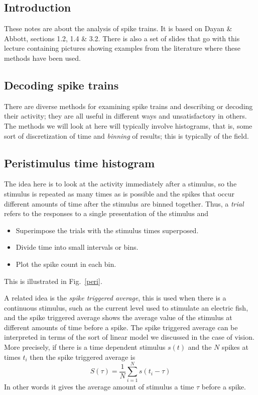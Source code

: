 \documentclass[11pt,a4paper]{scrartcl}
\begin{document}
\subsection*{Introduction}
These notes are about the analysis of spike trains. It is based on
Dayan \& Abbott, sections 1.2, 1.4 \& 3.2. There is also a set of
slides that go with this lecture containing pictures showing examples
from the literature where these methods have been used.

\subsection*{Decoding spike trains}
There are diverse methods for examining spike trains and describing or
decoding their activity; they are all useful in different ways and
unsatisfactory in others. The methods we will look at here will
typically involve histograms, that is, some sort of discretization of
time and \textsl{binning} of results; this is typically of the field.

\subsection*{Peristimulus time histogram}
The idea here is to look at the activity immediately after a
stimulus, so the stimulus is repeated as many times as is possible and
the spikes that occur different amounts of time after the stimulus are
binned together. Thus, a \textsl{trial} refers to the responses to a single presentation of the stimulus and
\begin{itemize}
\item Superimpose the trials with the stimulus times superposed.
\item Divide time into small intervals or bins.
\item Plot the spike count in each bin.
\end{itemize}
This is illustrated in Fig.~\ref{peri}. 

A related idea is the \textsl{spike triggered average}, this is used
when there is a continuous stimulus, such as the current level used to
stimulate an electric fish, and the spike triggered average shows the
average value of the stimulus at different amounts of time before a
spike. The spike triggered average can be interpreted in terms of the
sort of linear model we discussed in the case of vision. More
precisely, if there is a time dependent stimulus $s(t)$ and the $N$
spikes at times $t_i$ then the spike triggered average is
\begin{equation}
S(\tau)=\frac{1}{N}\sum_{i=1}^N s(t_i-\tau)
\end{equation}
In other words it gives the average amount of stimulus a time $\tau$
before a spike.
\end{document}
